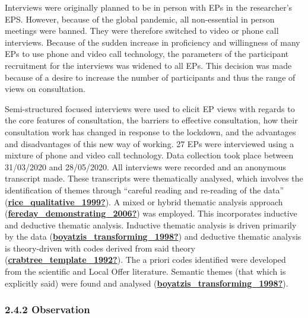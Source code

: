\documentclass[
]{article}
\begin{document}
Interviews were originally planned to be in person with EPs in the
researcher's EPS. However, because of the global pandemic, all
non-essential in person meetings were banned. They were therefore
switched to video or phone call interviews. Because of the sudden
increase in proficiency and willingness of many EPs to use phone and
video call technology, the parameters of the participant recruitment for
the interviews was widened to all EPs. This decision was made because of
a desire to increase the number of participants and thus the range of
views on consultation.

Semi-structured focused interviews were used to elicit EP views with
regards to the core features of consultation, the barriers to effective
consultation, how their consultation work has changed in response to the
lockdown, and the advantages and disadvantages of this new way of
working. 27 EPs were interviewed using a mixture of phone and video call
technology. Data collection took place between 31/03/2020 and
28/05/2020. All interviews were recorded and an anonymous transcript
made. These transcripts were thematically analysed, which involves the
identification of themes through ``careful reading and re-reading of the
data''
(\protect\hyperlink{ref-rice_qualitative_1999}{\textbf{rice\_qualitative\_1999?}}).
A mixed or hybrid thematic analysis approach
(\protect\hyperlink{ref-fereday_demonstrating_2006}{\textbf{fereday\_demonstrating\_2006?}})
was employed. This incorporates inductive and deductive thematic
analysis. Inductive thematic analysis is driven primarily by the data
(\protect\hyperlink{ref-boyatzis_transforming_1998}{\textbf{boyatzis\_transforming\_1998?}})
and deductive thematic analysis is theory-driven with codes derived from
said theory
(\protect\hyperlink{ref-crabtree_template_1992}{\textbf{crabtree\_template\_1992?}}).
The a priori codes identified were developed from the scientific and
Local Offer literature. Semantic themes (that which is explicitly said)
were found and analysed
(\protect\hyperlink{ref-boyatzis_transforming_1998}{\textbf{boyatzis\_transforming\_1998?}}).

\hypertarget{observation-1}{%
\subsubsection{2.4.2 Observation}\label{observation-1}}
\end{document}
